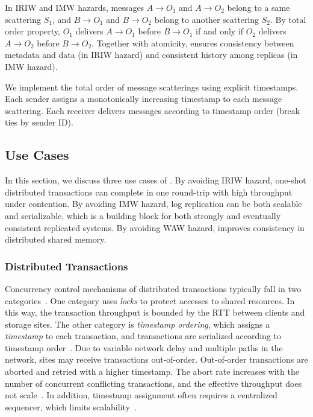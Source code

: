 In IRIW and IMW hazards, messages $A \rightarrow O_1$ and $A \rightarrow O_2$ belong to a same scattering $S_1$, and $B \rightarrow O_1$ and $B \rightarrow O_2$ belong to another scattering $S_2$.
By total order property, $O_1$ delivers $A \rightarrow O_1$ before $B \rightarrow O_1$ if and only if $O_2$ delivers $A \rightarrow O_2$ before $B \rightarrow O_2$.
Together with atomicity, \sys ensures consistency between metadata and data (in IRIW hazard) and consistent history among replicas (in IMW hazard).

We implement the total order of message scatterings using explicit timestamps.
Each sender assigns a monotonically increasing timestamp to each message scattering.
Each receiver delivers messages according to timestamp order (break ties by sender ID).

\subsection{Use Cases}
\label{subsec:application-scenarios}

In this section, we discuss three use cases of \sys.
By avoiding IRIW hazard, one-shot distributed transactions can complete in one round-trip with high throughput under contention.
By avoiding IMW hazard, log replication can be both scalable and serializable, which is a building block for both strongly and eventually consistent replicated systems.
By avoiding WAW hazard, \sys improves consistency in distributed shared memory.

\subsubsection{Distributed Transactions}
\label{subsec:transactional-kvs}

Concurrency control mechanisms of distributed transactions typically fall in two categories~\cite{bernstein1981concurrency}.
One category uses \textit{locks} to protect accesses to shared resources.
In this way, the transaction throughput is bounded by the RTT between clients and storage sites.
The other category is \textit{timestamp ordering}, which assigns a \textit{timestamp} to each transaction, and transactions are serialized according to timestamp order~\cite{kung1981optimistic,bernstein1983multiversion}.
Due to variable network delay and multiple paths in the network, sites may receive transactions out-of-order.
Out-of-order transactions are aborted and retried with a higher timestamp.
The abort rate increases with the number of concurrent conflicting transactions, and the effective throughput does not scale~\cite{yu2014staring}.
In addition, timestamp assignment often requires a centralized sequencer, which limits scalability~\cite{yu2014staring}.

